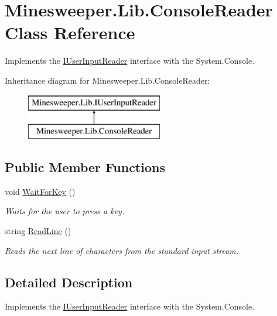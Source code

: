 \hypertarget{class_minesweeper_1_1_lib_1_1_console_reader}{\section{Minesweeper.\+Lib.\+Console\+Reader Class Reference}
\label{class_minesweeper_1_1_lib_1_1_console_reader}
}


Implements the \hyperlink{interface_minesweeper_1_1_lib_1_1_i_user_input_reader}{I\+User\+Input\+Reader} interface with the System.\+Console.  


Inheritance diagram for Minesweeper.\+Lib.\+Console\+Reader\+:\begin{figure}[H]
\begin{center}
\leavevmode
\includegraphics[height=2.000000cm]{class_minesweeper_1_1_lib_1_1_console_reader}
\end{center}
\end{figure}
\subsection*{Public Member Functions}
\begin{DoxyCompactItemize}
\item 
void \hyperlink{class_minesweeper_1_1_lib_1_1_console_reader_a92588508515c5082d628e9f56672e863}{Wait\+For\+Key} ()
\begin{DoxyCompactList}\small\item\em Waits for the user to press a key. \end{DoxyCompactList}\item 
string \hyperlink{class_minesweeper_1_1_lib_1_1_console_reader_ae6bb2ed667d1290078a0f9bb7b53e9a8}{Read\+Line} ()
\begin{DoxyCompactList}\small\item\em Reads the next line of characters from the standard input stream. \end{DoxyCompactList}\end{DoxyCompactItemize}


\subsection{Detailed Description}
Implements the \hyperlink{interface_minesweeper_1_1_lib_1_1_i_user_input_reader}{I\+User\+Input\+Reader} interface with the System.\+Console. 



